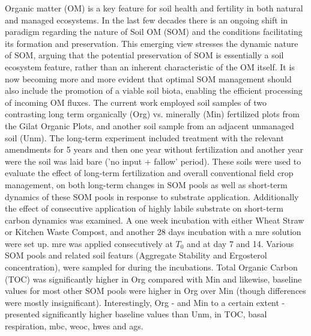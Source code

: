 	Organic matter (OM) is a key feature for soil health and fertility in both natural and managed ecosystems. In the last few decades there is an ongoing shift in paradigm regarding the nature of Soil OM (SOM) and the conditions facilitating its formation and preservation. This emerging view stresses the dynamic nature of SOM, arguing that the potential preservation of SOM is essentially a soil ecosystem feature, rather than an inherent characteristic of the OM itself. It is now becoming more and more evident that optimal SOM management should also include the promotion of a viable soil biota, enabling the efficient processing of incoming OM fluxes. The current work employed soil samples of two contrasting long term organically (Org) vs. minerally (Min) fertilized plots from  the Gilat Organic Plots, and another soil sample from an adjacent unmanaged soil (Unm). The long-term experiment included treatment with the relevant amendments for 5 years and then one year without fertilization and another year were the soil was laid bare ('no input + fallow' period). These soils were used to evaluate the effect of long-term fertilization and overall conventional field crop management, on both long-term changes in SOM pools as well as short-term dynamics of these SOM pools in response to substrate application. Additionally the effect of consecutive application of highly labile substrate on short-term carbon dynamics was examined. 
	A one week incubation with either Wheat Straw or Kitchen Waste Compost, and another 28 days incubation with a \gls{mre} solution were set up. \gls{mre} was applied consecutively at $ T_0 $ and at day 7 and 14. Various SOM pools and related soil featurs (Aggregate Stability and Ergosterol concentration), were sampled for during the incubations.  
	Total Organic Carbon (TOC) was significantly higher in Org compared with Min and likewise, baseline values  for most other SOM pools were higher in Org over Min (though differences were mostly insignificant). Interestingly, Org - and Min to a certain extent - presented significantly higher baseline values than Unm, in TOC, basal respiration, \gls{mbc}, \gls{weoc}, \gls{hwes} and \gls{ags}. 
